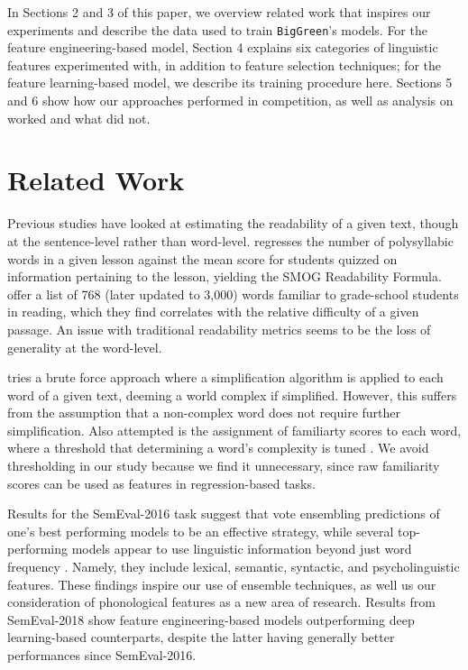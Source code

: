 \documentclass{dcthesis}
\theoremstyle{definition}
\theoremstyle{remark}
\begin{document}
In Sections 2 and 3 of this paper, we overview related work that inspires our experiments and describe the data used to train \texttt{BigGreen}'s models. For the feature engineering-based model, Section 4 explains six categories of linguistic features experimented with, in addition to feature selection techniques; for the feature learning-based model, we describe its training procedure here. Sections 5 and 6 show how our approaches performed in competition, as well as analysis on worked and what did not.

\chapter{Related Work}

Previous studies have looked at estimating the readability of a given text, though at the sentence-level rather than word-level. \citet{10.2307/40011226} regresses the number of polysyllabic words in a given lesson against the mean score for students quizzed on information pertaining to the lesson, yielding the SMOG Readability Formula. \citet{10.2307/1473169} offer a list of 768 (later updated to 3,000) words familiar to grade-school students in reading, which they find correlates with the relative difficulty of a given passage. An issue with traditional readability metrics seems to be the loss of generality at the word-level.

\citet{shardlow2013comparison} tries a brute force approach where a simplification algorithm is applied to each word of a given text, deeming a world complex if simplified. However, this suffers from the assumption that a non-complex word does not require further simplification. Also attempted is the assignment of familiarty scores to each word, where a threshold that determining a word's complexity is tuned \citep{shardlow2013comparison}. We avoid thresholding in our study because we find it unnecessary, since raw familiarity scores can be used as features in regression-based tasks. 

Results for the SemEval-2016 task \citep{zampieriEtAl:2017:NLPTEA} suggest that vote ensembling predictions of one's best performing models to be an effective strategy, while several top-performing models appear to use linguistic information beyond just word frequency \citep{paetzoldspecia2016sv000gg, ronzanoetal2016taln, mukherjeeetal2016ju}. Namely, they include lexical, semantic, syntactic, and psycholinguistic features. These findings inspire our use of ensemble techniques, as well us our consideration of phonological features as a new area of research. Results from SemEval-2018 show feature engineering-based models outperforming deep learning-based counterparts, despite the latter having generally better performances since SemEval-2016.
\end{document}
